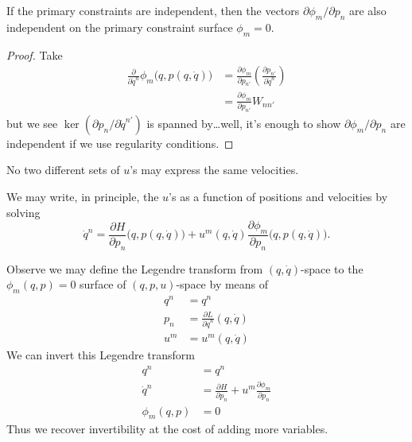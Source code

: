 \begin{prop}
If the primary constraints are independent, then the vectors
$\partial\phi_{m}/\partial p_{n}$ are also independent on the primary
constraint surface $\phi_{m}=0$.
\end{prop}
\begin{proof}
Take
\begin{equation}
\begin{split}
\frac{\partial}{\partial\dot{q}^{n}}\phi_{m}\bigl(q, p(q, \dot{q})\bigr)
&=\frac{\partial\phi_{m}}{\partial p_{n'}}\left(\frac{\partial p_{n'}}{\partial\dot{q}^{n}}\right)\\  
&=\frac{\partial\phi_{m}}{\partial p_{n'}}W_{nn'}
\end{split}
\end{equation}
but we see $\ker(\partial p_{n}/\partial\dot{q}^{n'})$ is spanned
by\dots well, it's enough to show $\partial\phi_{m}/\partial p_{n}$ are
independent if we use regularity conditions.
\end{proof}
\begin{cor}
No two different sets of $u$'s may express the same velocities.
\end{cor}

\M
We may write, in principle, the $u$'s as a function of positions and
velocities by solving
\begin{equation}
\dot{q}^{n} = \frac{\partial H}{\partial p_{n}}\bigl(q, p(q,\dot{q})\bigr)
+ u^{m}(q, \dot{q})%
\frac{\partial\phi_{m}}{\partial p_{n}}\bigl(q, p(q,\dot{q})\bigr).
\end{equation}

\M
Observe we may define the Legendre transform from $(q,\dot{q})$-space to
the $\phi_{m}(q,p)=0$ surface of $(q,p,u)$-space by means of
\begin{subequations}
\begin{align}
q^{n} &= q^{n}\\
p_{n} &= \frac{\partial L}{\partial\dot{q}^{n}}(q,\dot{q})\\
u^{m} &= u^{m}(q, \dot{q})
\end{align}
\end{subequations}
We can invert this Legendre transform
\begin{subequations}
\begin{align}
q^{n}         &= q^{n}\\
\dot{q}^{n}   &= \frac{\partial H}{\partial p_{n}} +
                 u^{m}\frac{\partial\phi_{m}}{\partial p_{n}}\\
\phi_{m}(q,p) &= 0
\end{align}
\end{subequations}
Thus we recover invertibility at the cost of adding more variables.

